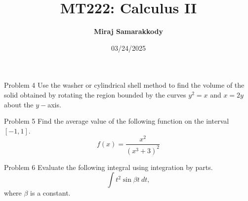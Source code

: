 \documentclass{beamer}
\title{MT222: Calculus II}
\author{\textbf{Miraj Samarakkody}}
\institute{Tougaloo College}
\date{03/24/2025}
\begin{document}
\begin{frame}
    \titlepage
\end{frame}






\begin{frame}{Problem 4}
    Use the washer or cylindrical shell method to find the volume of the solid obtained by rotating the region bounded by the curves $y^2=x$ and $x=2y$ about the $y-$axis.
\end{frame}

\begin{frame}{Problem 5}
    Find the average value of the following function on the interval \([-1,1]\). 
\[
f(x)=\dfrac{x^2}{(x^3+3)^2}
\] 
\end{frame}

\begin{frame}{Problem 6}
    Evaluate the following integral using integration by parts.
\[
\int t^2 \sin {\beta t}~dt,
\] where \(\beta \) is a constant. 
\end{frame}
\end{document}
